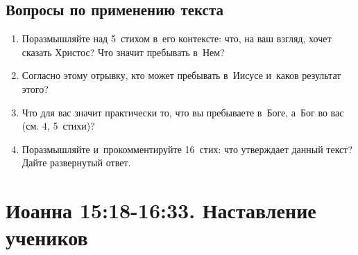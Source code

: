 \documentclass[a4paper,12pt]{article}
\begin{document}
\subsection*{Вопросы по применению текста} 
\begin{enumerate}
    \item Поразмышляйте над 5~стихом в~его контексте: что, на ваш взгляд, хочет сказать Христос? Что значит пребывать в~Нем?
    
    \myline
    
    \myline
    \item Согласно этому отрывку, кто может пребывать в~Иисусе и~каков результат этого? 
    
    \myline
    
    \myline
    \item Что для вас значит практически то, что вы пребываете в~Боге, а~Бог во вас (см. 4, 5~стихи)? 
    
    \myline
    
    \myline
    \item Поразмышляйте и~прокомментируйте 16~стих: что утверждает данный текст? Дайте развернутый ответ.
    
    \myline
    
    \myline
\end{enumerate}



\section{Иоанна 15:18-16:33. Наставление учеников}
\end{document}
